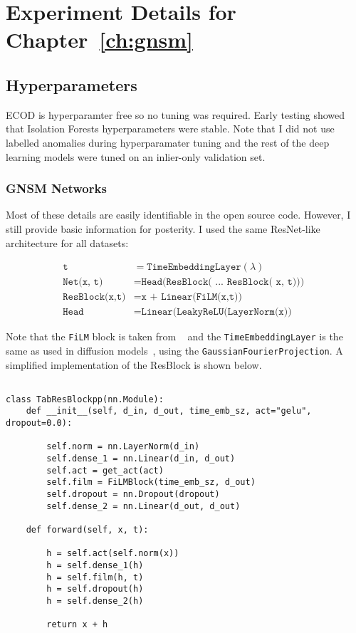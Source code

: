 \chapter{Experiment Details for Chapter~\ref{ch:gnsm}}

\section{Hyperparameters}

ECOD is hyperparamter free so no tuning was required. Early testing showed that Isolation Forests hyperparameters were stable. Note that I did not use labelled anomalies during hyperparamater tuning and the rest of the deep learning models were tuned on an inlier-only validation set.

\subsection*{GNSM Networks}

Most of these details are easily identifiable in the open source code. However, I still provide basic information for posterity. I used the same ResNet-like architecture for all datasets:

\begin{align}
    \texttt{t} &= \texttt{TimeEmbeddingLayer}(\lambda) \\
    \texttt{Net(x, t)} &= \texttt{Head(ResBlock( ... ResBlock( x, t))) } \\
    \texttt{ResBlock(x,t)} &= \texttt{x + Linear(FiLM(x,t))} \\
    \texttt{Head} &= \texttt{Linear(LeakyReLU(LayerNorm(x))}
\end{align}

Note that the \texttt{FiLM} block is taken from ~\cite{perez2018film} and the \texttt{TimeEmbeddingLayer} is the same as used in diffusion models~\cite{song2020score}, using the \texttt{GaussianFourierProjection}.
A simplified implementation of the ResBlock is shown below.

\begin{verbatim}

class TabResBlockpp(nn.Module):
    def __init__(self, d_in, d_out, time_emb_sz, act="gelu", dropout=0.0):
    
        self.norm = nn.LayerNorm(d_in)
        self.dense_1 = nn.Linear(d_in, d_out)
        self.act = get_act(act)
        self.film = FiLMBlock(time_emb_sz, d_out)
        self.dropout = nn.Dropout(dropout)
        self.dense_2 = nn.Linear(d_out, d_out)

    def forward(self, x, t):
        
        h = self.act(self.norm(x))
        h = self.dense_1(h)
        h = self.film(h, t)
        h = self.dropout(h)
        h = self.dense_2(h)

        return x + h
\end{verbatim}

